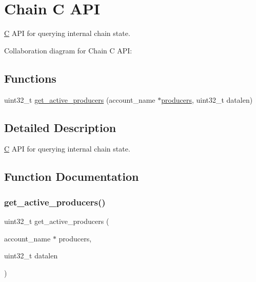 \hypertarget{group__chaincapi}{}\section{Chain C A\+PI}
\label{group__chaincapi}


\mbox{\hyperlink{struct_c}{C}} A\+PI for querying internal chain state.  


Collaboration diagram for Chain C A\+PI\+:
\subsection*{Functions}
\begin{DoxyCompactItemize}
\item 
uint32\+\_\+t \mbox{\hyperlink{group__chaincapi_gad24c6348e365fca793e903acdfbb776c}{get\+\_\+active\+\_\+producers}} (account\+\_\+name $\ast$\mbox{\hyperlink{structproducers}{producers}}, uint32\+\_\+t datalen)
\end{DoxyCompactItemize}


\subsection{Detailed Description}
\mbox{\hyperlink{struct_c}{C}} A\+PI for querying internal chain state. 



\subsection{Function Documentation}
\mbox{\label{group__chaincapi_gad24c6348e365fca793e903acdfbb776c}} 
\subsubsection{\texorpdfstring{get\+\_\+active\+\_\+producers()}{get\_active\_producers()}}
{\footnotesize\ttfamily uint32\+\_\+t get\+\_\+active\+\_\+producers (\begin{DoxyParamCaption}\item[{account\+\_\+name $\ast$}]{producers,  }\item[{uint32\+\_\+t}]{datalen }\end{DoxyParamCaption})}

